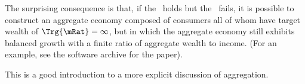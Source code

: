 \documentclass[BufferStockTheory]{subfiles}
\begin{document}
The surprising consequence is that, if the {\GICRaw}~holds but the {\GICNrm}~fails, it is possible to construct an aggregate economy composed of consumers all of whom have target wealth of $\Trg{\mRat}=\infty$, but in which the aggregate economy still exhibits balanced growth with a finite ratio of aggregate wealth to income.  (For an example, see the software archive for the paper).

This is a good introduction to a more explicit discussion of aggregation.


\begin{comment}
\subsubsection{Example Where There Is A Solution Without A Target}\label{subsubsec:FVACnotGIC}

To build intuition, it is useful to describe an example in which a nondegenerate solution exists but a target $\mTrg$ does not.  An example that satisfies the combination \FVAC~and~\cncl{\GICNrm} is depicted in Figure \ref{fig:FVACnotGIC}.  The consumption function is shown along with the $\Ex_{t}[\Delta \mRat_{t+1}]=0$ locus that identifies the `sustainable' level of spending at which $\mRat$ is expected to remain unchanged.  The diagram suggests a fact that is confirmed by deeper analysis: Under the depicted configuration of parameter values (see the code for details), the consumption function never reaches the $\Ex_{t}[\Delta \mRat_{t+1}]=0$ locus; indeed, when the \RIC~holds but the \GICNrm~does not, the consumption function's limiting slope $(1-\Pat/\Rfree)$ is shallower than that of the sustainable consumption locus $(1-\PGroAdj/\Rfree)$,\footnote{This is because $\Ex_{t}[\mRat_{t+1}]=\Ex_{t}[\Rnorm_{t+1}(\mRat_{t}-\cRat_{t})]+1$; solve $\mRat = (\mRat - \cRat)\Rnorm \InvEpShkInv^{-1}+1$ for $\cRat$ and differentiate.}  so the gap between the two \textit{increases} with $\mRat$ in the limit.  Although a nondegenerate consumption function exists, a target level of $\mRat$ does not (or, rather, the target is $\mRat=\infty$), because no matter how wealthy a consumer becomes, the consumer will always spend less than the amount that would keep $\mRat$ stable (in expectation).

\renewcommand{\figFile}{FVACnotGIC}
\hypertarget{\figFile}{}


\hypertarget{cGroLTpGro}{}




\end{comment}
\end{document}
